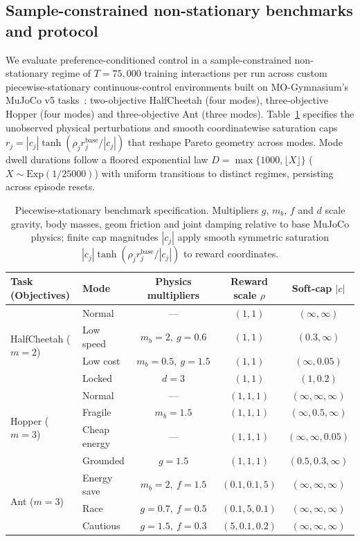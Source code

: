 \subsection{Sample-constrained non-stationary benchmarks and protocol}
\label{sec:mujoco_3d}

We evaluate preference-conditioned control in a sample-constrained
non-stationary regime of $T = 75{,}000$ training interactions per run across
custom piecewise-stationary continuous-control environments built on
MO-Gymnasium's MuJoCo v5 tasks~\cite{Felten2023Toolkit}: two-objective HalfCheetah (four modes), three-objective
Hopper (four modes) and three-objective Ant (three modes). Table~\ref{tab:task_modes}
specifies the unobserved physical perturbations and smooth coordinatewise
saturation caps $r_j = |c_j|\tanh(\rho_j r_j^{\mathrm{base}} / |c_j|)$ that
reshape Pareto geometry across modes. Mode dwell durations follow a floored
exponential law $D = \max\{1000, \lfloor X \rfloor\}$ ($X \sim \mathrm{Exp}(1/25000)$)
with uniform transitions to distinct regimes, persisting across episode resets.

\begin{table}[t]
\centering\small
\caption{Piecewise-stationary benchmark specification. Multipliers $g$, $m_b$, $f$
and $d$ scale gravity, body masses, geom friction and joint damping relative to
base MuJoCo physics; finite cap magnitudes $|c_j|$ apply smooth symmetric
saturation $|c_j|\tanh(\rho_j r_j^{\mathrm{base}}/|c_j|)$ to reward coordinates.}
\label{tab:task_modes}
\begin{tabular}{@{}llccc@{}}
\toprule
Task (Objectives) & Mode & Physics multipliers & Reward scale $\rho$ & Soft-cap $|c|$ \\
\midrule
\multirow{4}{*}{HalfCheetah ($m=2$)}
 & Normal & --- & $(1,1)$ & $(\infty,\infty)$ \\
 & Low speed & $m_b=2,\ g=0.6$ & $(1,1)$ & $(0.3,\infty)$ \\
 & Low cost & $m_b=0.5,\ g=1.5$ & $(1,1)$ & $(\infty,0.05)$ \\
 & Locked & $d=3$ & $(1,1)$ & $(1,0.2)$ \\
\midrule
\multirow{4}{*}{Hopper ($m=3$)}
 & Normal & --- & $(1,1,1)$ & $(\infty,\infty,\infty)$ \\
 & Fragile & $m_b=1.5$ & $(1,1,1)$ & $(\infty,0.5,\infty)$ \\
 & Cheap energy & --- & $(1,1,1)$ & $(\infty,\infty,0.05)$ \\
 & Grounded & $g=1.5$ & $(1,1,1)$ & $(0.5,0.3,\infty)$ \\
\midrule
\multirow{3}{*}{Ant ($m=3$)}
 & Energy save & $m_b=2,\ f=1.5$ & $(0.1,0.1,5)$ & $(\infty,\infty,\infty)$ \\
 & Race & $g=0.7,\ f=0.5$ & $(0.1,5,0.1)$ & $(\infty,\infty,\infty)$ \\
 & Cautious & $g=1.5,\ f=0.3$ & $(5,0.1,0.2)$ & $(\infty,\infty,\infty)$ \\
\bottomrule
\end{tabular}
\end{table}

